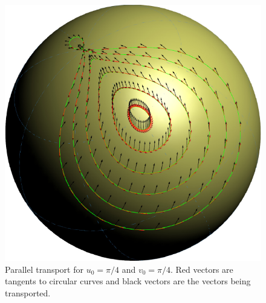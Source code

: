 \begin{figure}[h]
	\begin{center}
	\includegraphics[scale=1]{parallel_transport2} 
	\end{center}
	\caption{Parallel transport for $u_{0}=\pi/4$ and $v_{0}=\pi/4$. Red vectors are tangents to circular curves and black vectors
	are the vectors being transported.}\label{fig2}
\end{figure}


